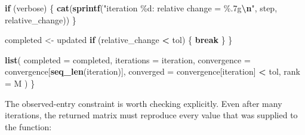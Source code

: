 \documentclass[
  11pt,
]{article}
\newenvironment{Shaded}{\begin{snugshade}}{\end{snugshade}}
\newcommand{\AttributeTok}[1]{\textcolor[rgb]{0.13,0.29,0.53}{#1}}
\newcommand{\ConstantTok}[1]{\textcolor[rgb]{0.56,0.35,0.01}{#1}}
\newcommand{\ControlFlowTok}[1]{\textcolor[rgb]{0.13,0.29,0.53}{\textbf{#1}}}
\newcommand{\DecValTok}[1]{\textcolor[rgb]{0.00,0.00,0.81}{#1}}
\newcommand{\FloatTok}[1]{\textcolor[rgb]{0.00,0.00,0.81}{#1}}
\newcommand{\FunctionTok}[1]{\textcolor[rgb]{0.13,0.29,0.53}{\textbf{#1}}}
\newcommand{\NormalTok}[1]{#1}
\newcommand{\OtherTok}[1]{\textcolor[rgb]{0.56,0.35,0.01}{#1}}
\newcommand{\SpecialCharTok}[1]{\textcolor[rgb]{0.81,0.36,0.00}{\textbf{#1}}}
\newcommand{\StringTok}[1]{\textcolor[rgb]{0.31,0.60,0.02}{#1}}
\begin{document}
\begin{Shaded}
\begin{Highlighting}[]
    \ControlFlowTok{if}\NormalTok{ (verbose) \{}
      \FunctionTok{cat}\NormalTok{(}\FunctionTok{sprintf}\NormalTok{(}\StringTok{"iteration \%d: relative change = \%.7g}\SpecialCharTok{\textbackslash{}n}\StringTok{"}\NormalTok{,}
\NormalTok{                  step, relative\_change))}
\NormalTok{    \}}

\NormalTok{    completed }\OtherTok{\textless{}{-}}\NormalTok{ updated}
    \ControlFlowTok{if}\NormalTok{ (relative\_change }\SpecialCharTok{\textless{}}\NormalTok{ tol) \{}
      \ControlFlowTok{break}
\NormalTok{    \}}
\NormalTok{  \}}

  \FunctionTok{list}\NormalTok{(}
    \AttributeTok{completed =}\NormalTok{ completed,}
    \AttributeTok{iterations =}\NormalTok{ iteration,}
    \AttributeTok{convergence =}\NormalTok{ convergence[}\FunctionTok{seq\_len}\NormalTok{(iteration)],}
    \AttributeTok{converged =}\NormalTok{ convergence[iteration] }\SpecialCharTok{\textless{}}\NormalTok{ tol,}
    \AttributeTok{rank =}\NormalTok{ M}
\NormalTok{  )}
\NormalTok{\}}
\end{Highlighting}
\end{Shaded}

The observed-entry constraint is worth checking explicitly. Even after
many iterations, the returned matrix must reproduce every value that was
supplied to the function:

\begin{Shaded}
\end{Shaded}
\end{document}
